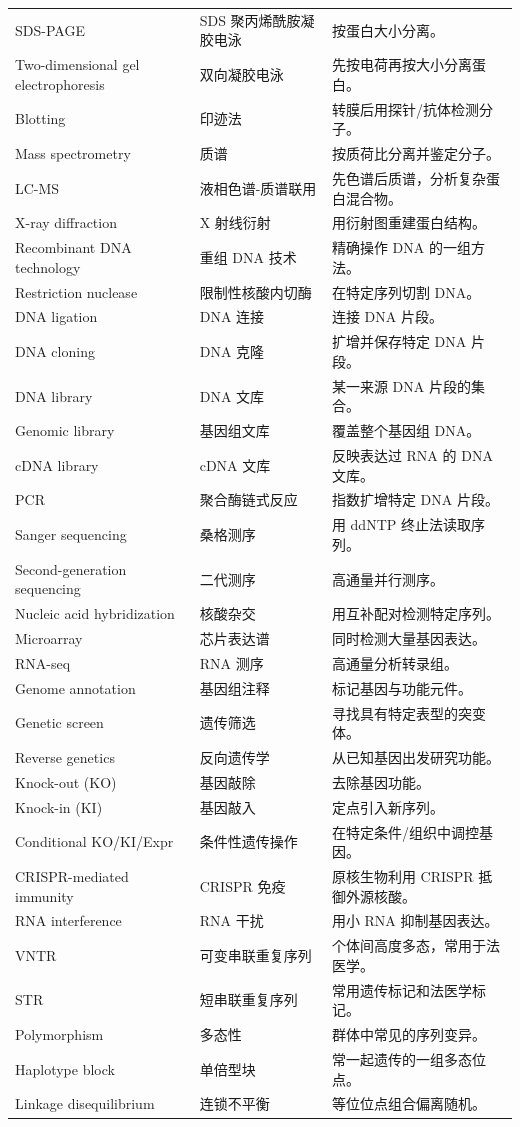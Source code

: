 \documentclass[11pt,fontset=none]{ctexart}
\begin{document}
\begin{longtable}{L{3.2cm} L{3.8cm} L{8.5cm}}
SDS-PAGE & SDS 聚丙烯酰胺凝胶电泳 & 按蛋白大小分离。 \\
Two-dimensional gel electrophoresis & 双向凝胶电泳 & 先按电荷再按大小分离蛋白。 \\
Blotting & 印迹法 & 转膜后用探针/抗体检测分子。 \\
Mass spectrometry & 质谱 & 按质荷比分离并鉴定分子。 \\
LC-MS & 液相色谱-质谱联用 & 先色谱后质谱，分析复杂蛋白混合物。 \\
X-ray diffraction & X 射线衍射 & 用衍射图重建蛋白结构。 \\
Recombinant DNA technology & 重组 DNA 技术 & 精确操作 DNA 的一组方法。 \\
Restriction nuclease & 限制性核酸内切酶 & 在特定序列切割 DNA。 \\
DNA ligation & DNA 连接 & 连接 DNA 片段。 \\
DNA cloning & DNA 克隆 & 扩增并保存特定 DNA 片段。 \\
DNA library & DNA 文库 & 某一来源 DNA 片段的集合。 \\
Genomic library & 基因组文库 & 覆盖整个基因组 DNA。 \\
cDNA library & cDNA 文库 & 反映表达过 RNA 的 DNA 文库。 \\
PCR & 聚合酶链式反应 & 指数扩增特定 DNA 片段。 \\
Sanger sequencing & 桑格测序 & 用 ddNTP 终止法读取序列。 \\
Second-generation sequencing & 二代测序 & 高通量并行测序。 \\
Nucleic acid hybridization & 核酸杂交 & 用互补配对检测特定序列。 \\
Microarray & 芯片表达谱 & 同时检测大量基因表达。 \\
RNA-seq & RNA 测序 & 高通量分析转录组。 \\
Genome annotation & 基因组注释 & 标记基因与功能元件。 \\
Genetic screen & 遗传筛选 & 寻找具有特定表型的突变体。 \\
Reverse genetics & 反向遗传学 & 从已知基因出发研究功能。 \\
Knock-out (KO) & 基因敲除 & 去除基因功能。 \\
Knock-in (KI) & 基因敲入 & 定点引入新序列。 \\
Conditional KO/KI/Expr & 条件性遗传操作 & 在特定条件/组织中调控基因。 \\
CRISPR-mediated immunity & CRISPR 免疫 & 原核生物利用 CRISPR 抵御外源核酸。 \\
RNA interference & RNA 干扰 & 用小 RNA 抑制基因表达。 \\
VNTR & 可变串联重复序列 & 个体间高度多态，常用于法医学。 \\
STR & 短串联重复序列 & 常用遗传标记和法医学标记。 \\
Polymorphism & 多态性 & 群体中常见的序列变异。 \\
Haplotype block & 单倍型块 & 常一起遗传的一组多态位点。 \\
Linkage disequilibrium & 连锁不平衡 & 等位位点组合偏离随机。 \\
\end{longtable}
\end{document}
